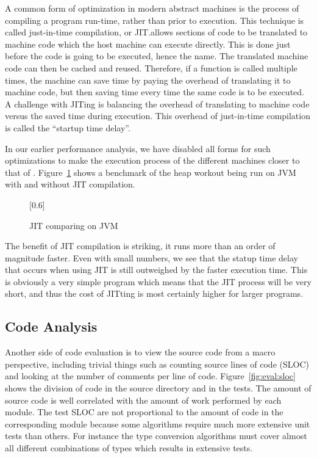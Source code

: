 A common form of optimization in modern abstract machines is the process of
compiling a program run-time, rather than prior to execution. This technique is
called just-in-time compilation, or JIT.\@This allows sections of code to be
translated to machine code which the host machine can execute directly. This is
done just before the code is going to be executed, hence the name. The
translated machine code can then be cached and reused. Therefore, if a function
is called multiple times, the machine can save time by paying the overhead of
translating it to machine code, but then saving time every time the same code is
to be executed. A challenge with JITing is balancing the overhead of translating
to machine code versus the saved time during execution. This overhead of
just-in-time compilation is called the ``startup time delay''.

In our earlier performance analysis, we have disabled all forms for such
optimizations to make the execution process of the different machines closer to
that of \thename{}. Figure~\ref{fig:eval:benchmark:jit} shows a benchmark of the
heap workout being run on JVM with and without JIT compilation.

\begin{figure}[H]
  \centering
  \scalebox{0.8}[0.6]{}
  \caption{JIT comparing on JVM}
\label{fig:eval:benchmark:jit}
\end{figure}

The benefit of JIT compilation is striking, it runs more than an order of
magnitude faster. Even with small numbers, we see that the statup time delay
that occurs when using JIT is still outweighed by the faster execution
time. This is obviously a very simple program which means that the JIT process
will be very short, and thus the cost of JITting is most certainly higher for
larger programs.

\subsection{Code Analysis}

Another side of code evaluation is to view the source code from a macro
perspective, including trivial things such as counting source lines of code
(SLOC) and looking at the number of comments per line of
code. Figure~\ref{fig:eval:sloc} shows the division of code in the source
directory and in the tests. The amount of source code is well correlated with
the amount of work performed by each module. The test SLOC are not proportional
to the amount of code in the corresponding module because some algorithms
require much more extensive unit tests than others. For instance the type
conversion algorithms must cover almost all different combinations of types
which results in extensive tests.

